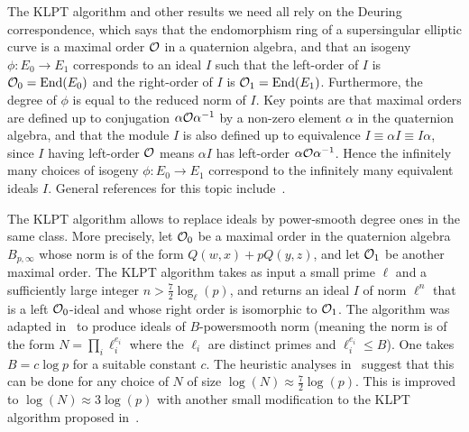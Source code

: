 The KLPT algorithm and other results we need all rely on the Deuring correspondence, which says that the endomorphism ring of a supersingular elliptic curve is a maximal order $\mathcal{O}$ in a quaternion algebra, and that an isogeny $\phi : E_0 \to E_1$ corresponds to an ideal $I$ such that the left-order of $I$ is $\mathcal{O}_0 = \text{End}(E_0)$ and the right-order of $I$ is $\mathcal{O}_1 = \text{End}(E_1)$. 
Furthermore, the degree of $\phi$ is equal to the reduced norm of $I$.
Key points are that maximal orders are defined up to conjugation $\alpha \mathcal{O} \alpha^{-1}$ by a non-zero element $\alpha$ in the quaternion algebra, and that the module $I$ is also defined up to equivalence $I \equiv \alpha I \equiv I \alpha$, since $I$ having left-order $\mathcal{O}$ means $\alpha I$ has left-order $\alpha \mathcal{O} \alpha^{-1}$.
Hence the infinitely many choices of isogeny $\phi : E_0 \to E_1$ correspond to the infinitely many equivalent ideals $I$.
General references for this topic include~\cite{Reductions18,KLPT}.

The KLPT algorithm allows to replace ideals by power-smooth degree ones in the same class.
%
More precisely, let $\mathcal{O}_0$ be a maximal order in the quaternion algebra $B_{p,\infty}$ whose norm is of the form $Q(w,x) + p Q(y,z)$, and let $\mathcal{O}_1$ be another maximal order.
%
The  KLPT algorithm takes as input a small prime $\ell$ and a sufficiently large integer $n > \tfrac{7}{2}\log_\ell( p)$, and returns an ideal $I$ of norm $\ell^n$ that is a left $\mathcal{O}_0$-ideal and whose right order is isomorphic to $\mathcal{O}_1$. 
%
The algorithm was adapted in~\cite{GPS20} to produce ideals of $B$-powersmooth norm (meaning the norm is of the form $N = \prod_i\ell_i^{e_i}$ where the $\ell_i$ are distinct primes and $\ell_i^{e_i} \le B$).
One takes $B = c \log p $ for a suitable constant $c$.
The heuristic analyses in~\cite{GPS20} suggest that this can be done for any choice of $N$ of size $\log(N) \approx \tfrac{7}{2} \log(p)$.
%
This is improved to $\log(N) \approx 3 \log(p)$ with another small modification to the KLPT algorithm proposed in~\cite{PetitSmith}.
%



